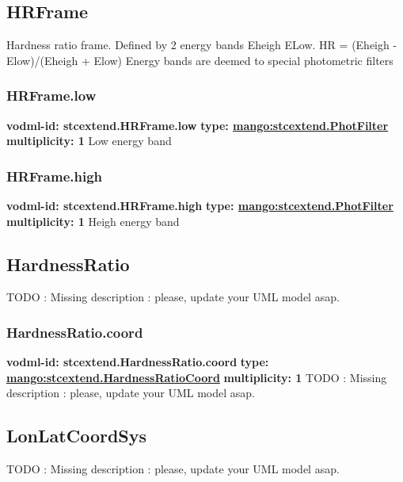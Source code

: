   \subsection{HRFrame}
  \label{sect:stcextend.HRFrame}
    Hardness ratio frame. Defined by 2 energy bands Eheigh ELow. HR = (Eheigh - Elow)/(Eheigh + Elow) Energy bands are deemed to special photometric filters

    \subsubsection{HRFrame.low}
      \textbf{vodml-id: stcextend.HRFrame.low} \newline
      \textbf{type: \hyperref[sect:stcextend.PhotFilter]{mango:stcextend.PhotFilter}} \newline
      \textbf{multiplicity: 1} \newline 
      Low energy band

    \subsubsection{HRFrame.high}
      \textbf{vodml-id: stcextend.HRFrame.high} \newline
      \textbf{type: \hyperref[sect:stcextend.PhotFilter]{mango:stcextend.PhotFilter}} \newline
      \textbf{multiplicity: 1} \newline 
      Heigh energy band

  \subsection{HardnessRatio}
  \label{sect:stcextend.HardnessRatio}
    TODO : Missing description : please, update your UML model asap.

    \subsubsection{HardnessRatio.coord}
      \textbf{vodml-id: stcextend.HardnessRatio.coord} \newline
      \textbf{type: \hyperref[sect:stcextend.HardnessRatioCoord]{mango:stcextend.HardnessRatioCoord}} \newline
      \textbf{multiplicity: 1} \newline 
      TODO : Missing description : please, update your UML model asap.

  \subsection{LonLatCoordSys}
  \label{sect:stcextend.LonLatCoordSys}
    TODO : Missing description : please, update your UML model asap.

